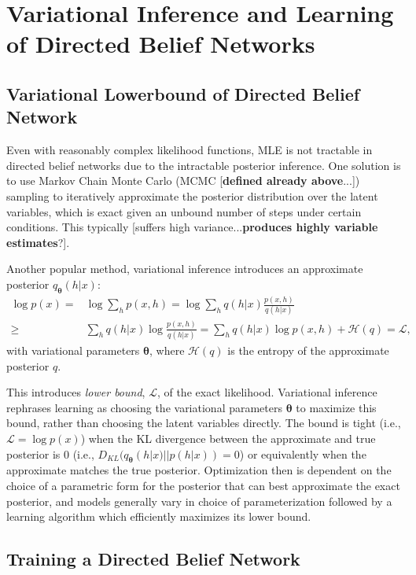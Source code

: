 \documentclass{article} %
\newcommand{\vects}[1]{\boldsymbol{#1}}
\newcommand{\TT}[0]{\vects{\theta}}
\newcommand{\LL}[0]{\mathcal{L}}
\newcommand{\HH}[0]{\mathcal{H}}
\begin{document}
\section{Variational Inference and Learning of Directed Belief Networks}
\subsection{Variational Lowerbound of Directed Belief Network}

Even with reasonably complex likelihood functions, MLE is not tractable in
directed belief networks due to the intractable posterior inference.  One
solution is to use Markov Chain Monte Carlo (MCMC [\textbf{defined already above}...]) sampling to iteratively
approximate the posterior distribution over the latent variables, which is exact
given an unbound number of steps under certain conditions. This typically
[suffers high variance...\textbf{produces highly variable estimates}?]. 

Another popular method, variational inference introduces an approximate
posterior $q_{\TT}(h|x)$:
\begin{align}
    \label{eq:approx_logp}
    \log p(x) =& \log \sum_{h} p(x, h) 
    = \log \sum_h q(h|x) \frac{p(x, h)}{q(h|x)} \nonumber \\
    \geq& \sum_h q(h|x) \log \frac{p(x, h)}{q(h|x)} 
    = \sum_h q(h|x) \log p(x,h) + \HH(q) = \LL,
\end{align}
with variational parameters $\TT$, where $\HH(q)$ is the entropy of the
approximate posterior $q$. 

This introduces \emph{lower bound}, $\LL$, of the exact likelihood. Variational
inference rephrases learning as choosing the variational parameters $\TT$ to
maximize this bound, rather than choosing the latent variables directly. The
bound is tight (i.e., $\LL = \log p(x)$) when the KL divergence between the
approximate and true posterior is $0$ (i.e., $D_{KL}(q_{\TT}(h|x)||p(h|x)) =
0$) or equivalently when the approximate matches the true posterior.
Optimization then is dependent on the choice of a parametric form for the
posterior that can best approximate the exact posterior, and models generally
vary in choice of parameterization followed by a learning algorithm which
efficiently maximizes its lower bound.

\subsection{Training a Directed Belief Network}
\end{document}
